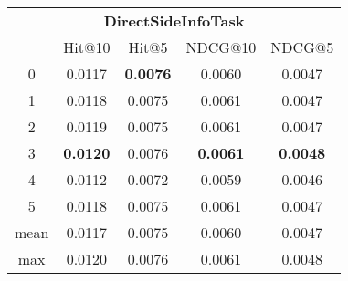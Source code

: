 \documentclass{article}
\begin{document}
 

\begin{tabular}{c|cccc}

\multicolumn{5}{c}{\textbf{DirectSideInfoTask}} \\
\noalign{\smallskip}
\noalign{\smallskip}
\toprule
\multicolumn{1}{c}{Template ID}	&	\multicolumn{1}{|c}{Hit@10}	&	\multicolumn{1}{c}{Hit@5}	&	\multicolumn{1}{c}{NDCG@10}	&	\multicolumn{1}{c}{NDCG@5}\\
\midrule
0	&	0.0117	&	\textbf{0.0076}	&	0.0060	&	0.0047\\
1	&	0.0118	&	0.0075	&	0.0061	&	0.0047\\
2	&	0.0119	&	0.0075	&	0.0061	&	0.0047\\
3	&	\textbf{0.0120}	&	0.0076	&	\textbf{0.0061}	&	\textbf{0.0048}\\
4	&	0.0112	&	0.0072	&	0.0059	&	0.0046\\
5	&	0.0118	&	0.0075	&	0.0061	&	0.0047\\
\midrule
mean	&	0.0117	&	0.0075	&	0.0060	&	0.0047\\
max	&	0.0120	&	0.0076	&	0.0061	&	0.0048\\
\bottomrule

\end{tabular}
\end{document}
